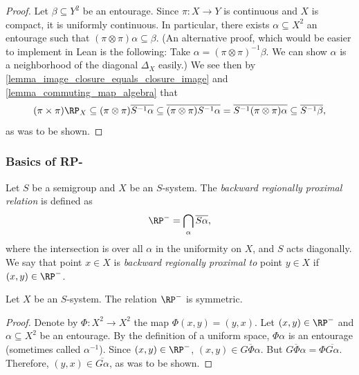 \begin{proof}
\leanok{}
    Let $\beta \subseteq Y^2$ be an entourage.  Since $\pi: X \to Y$ is continuous and $X$ is compact, it is uniformly continuous.  In particular, there exists $\alpha \subseteq X^2$ an entourage such that $(\pi \otimes \pi) \alpha \subseteq \beta$. (An alternative proof, which would be easier to implement in Lean is the following: Take $\alpha = (\pi \otimes \pi)^{-1} \beta$. We can show $\alpha$ is a neighborhood of the diagonal $\Delta_X$ easily.) We see then by \cref{lemma_image_closure_equals_closure_image} and \cref{lemma_commuting_map_algebra} that
    \[
        (\pi \times \pi) \RP_X \subseteq (\pi \otimes \pi) \overline{S^{-1} \alpha} \subseteq \overline{(\pi \otimes \pi) S^{-1} \alpha} = \overline{S^{-1}(\pi \otimes \pi) \alpha} \subseteq \overline{S^{-1} \beta},\]
    as was to be shown.
\end{proof}


\subsubsection{Basics of RP-}


\begin{definition}
\label{def_rp_relation}
    Let $S$ be a semigroup and $X$ be an $S$-system.  The \emph{backward regionally proximal relation} is defined as
    \[\RP^- = \bigcap_{\alpha} \overline{S \alpha},\]
    where the intersection is over all $\alpha$ in the uniformity on $X$, and $S$ acts diagonally.  We say that point $x \in X$ is \emph{backward regionally proximal to} point $y \in X$ if $(x,y) \in \RP^-$.
\end{definition}

\begin{lemma}
    \label{lemma_rp_basics_symmetric}
    \leanok{}
    Let $X$ be an $S$-system.  The relation $\RP^-$ is symmetric.
\end{lemma}

\begin{proof}
\leanok{}
    Denote by $\Phi: X^2 \to X^2$ the map $\Phi(x,y) = (y,x)$. Let $(x,y) \in \RP^-$ and $\alpha \subseteq X^2$ be an entourage. By the definition of a uniform space, $\Phi \alpha$ is an entourage (sometimes called $\alpha^{-1}$). Since $(x,y) \in \RP^-$, $(x,y) \in \overline{G \Phi \alpha}$. But $\overline{G \Phi \alpha} = \Phi \overline{G \alpha}$. Therefore, $(y,x) \in \overline{G \alpha}$, as was to be shown.
\end{proof}

